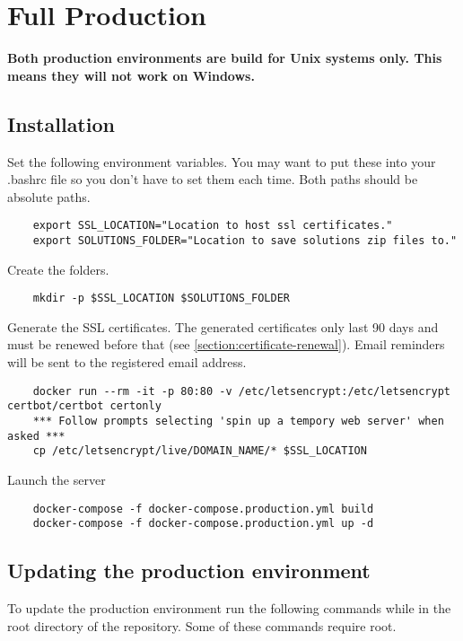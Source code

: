 \section{Full Production}

\textbf{Both production environments are build for Unix systems only.  This means they will not work on Windows.}

\subsection{Installation}

Set the following environment variables.  You may want to put these into your .bashrc file so you don't have to set them each time.  Both paths should be absolute paths.

\begin{verbatim}
	export SSL_LOCATION="Location to host ssl certificates."
	export SOLUTIONS_FOLDER="Location to save solutions zip files to."
\end{verbatim}

Create the folders.

\begin{verbatim}
	mkdir -p $SSL_LOCATION $SOLUTIONS_FOLDER
\end{verbatim}

Generate the SSL certificates.  The generated certificates only last 90 days and must be renewed before that (see \ref{section:certificate-renewal}).  Email reminders will be sent to the registered email address.

\begin{verbatim}
	docker run --rm -it -p 80:80 -v /etc/letsencrypt:/etc/letsencrypt certbot/certbot certonly
	*** Follow prompts selecting 'spin up a tempory web server' when asked ***
	cp /etc/letsencrypt/live/DOMAIN_NAME/* $SSL_LOCATION
\end{verbatim}

Launch the server

\begin{verbatim}
	docker-compose -f docker-compose.production.yml build
	docker-compose -f docker-compose.production.yml up -d
\end{verbatim}

\subsection{Updating the production environment}

To update the production environment run the following commands while in the root directory of the repository.  Some of these commands require root.


